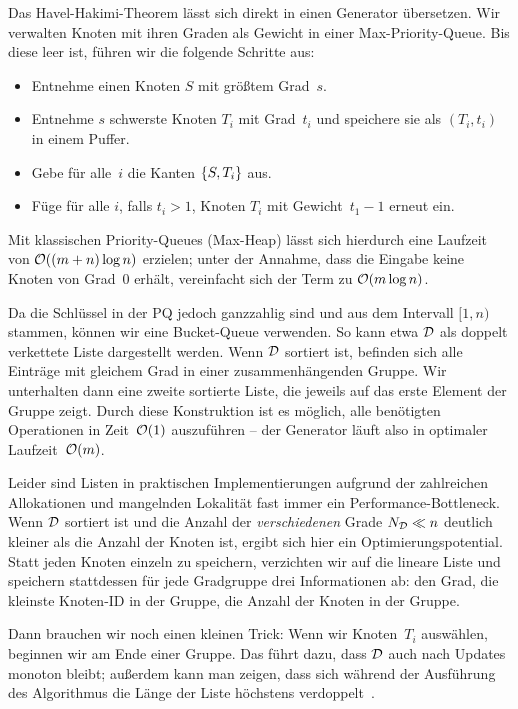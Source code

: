 Das Havel-Hakimi-Theorem lässt sich direkt in einen Generator übersetzen.
Wir verwalten Knoten mit ihren Graden als Gewicht in einer Max-Priority-Queue.
Bis diese leer ist, führen wir die folgende Schritte aus:
\begin{itemize}
    \item Entnehme einen Knoten $S$ mit größtem Grad~$s$.
    \item Entnehme $s$ schwerste Knoten $T_i$ mit Grad~$t_i$ und speichere sie als $(T_i, t_i)$ in einem Puffer.
    \item Gebe für alle~$i$ die Kanten $\left\{S, T_i\right\}$ aus.
    \item Füge für alle $i$, falls $t_i > 1$, Knoten $T_i$ mit Gewicht~$t_1 - 1$ erneut ein.
\end{itemize}

Mit klassischen Priority-Queues (\zB Max-Heap) lässt sich hierdurch eine Laufzeit von $\mathcal{O}\!\left((m + n) \log n\right)$ erzielen;
unter der Annahme, dass die Eingabe keine Knoten von Grad~0 erhält, vereinfacht sich der Term zu $\mathcal{O}\!\left(m \log n\right)$.

Da die Schlüssel in der PQ jedoch ganzzahlig sind und aus dem Intervall $[1, n)$ stammen, können wir eine Bucket-Queue verwenden.
So kann etwa $\mathcal{D}$ als doppelt verkettete Liste dargestellt werden.
Wenn $\mathcal{D}$ sortiert ist, befinden sich alle Einträge mit gleichem Grad in einer zusammenhängenden Gruppe.
Wir unterhalten dann eine zweite sortierte Liste, die jeweils auf das erste Element der Gruppe zeigt.
Durch diese Konstruktion ist es möglich, alle benötigten Operationen in Zeit~$\mathcal{O}\!\left(1\right)$ auszuführen -- der Generator läuft also in optimaler Laufzeit~$\mathcal{O}\!\left(m\right)$.

Leider sind Listen in praktischen Implementierungen aufgrund der zahlreichen Allokationen und mangelnden Lokalität fast immer ein Performance-Bottleneck.
Wenn $\mathcal{D}$ sortiert ist und die Anzahl der \emph{verschiedenen} Grade $N_{\mathcal{D}} \ll n$ deutlich kleiner als die Anzahl der Knoten ist, ergibt sich hier ein Optimierungspotential.
Statt jeden Knoten einzeln zu speichern, verzichten wir auf die  lineare Liste und speichern stattdessen für jede Gradgruppe drei Informationen ab:
den Grad, die kleinste Knoten-ID in der Gruppe, die Anzahl der Knoten in der Gruppe.

Dann brauchen wir noch einen kleinen Trick: Wenn wir Knoten~$T_i$ auswählen, beginnen wir am Ende einer Gruppe.
Das führt dazu, dass $\mathcal{D}$ auch nach Updates monoton bleibt; außerdem kann man zeigen, dass sich während der Ausführung des Algorithmus die Länge der Liste höchstens verdoppelt~\cite{DBLP:journals/jea/HamannMPTW18}.